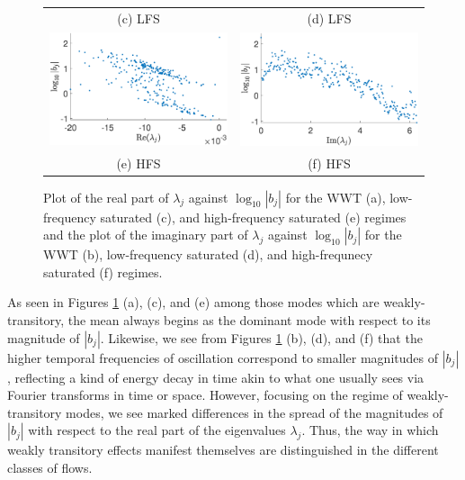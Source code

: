 \documentclass[a4paper,11pt]{article}
\begin{document}
\begin{figure}[!ht]
\begin{tabular}{cc}
(c) LFS & (d) LFS\\
\includegraphics[width=.525\textwidth]{bvals_vs_real_lam_hfforce_K_128_Lx_128_tf_1_pt5e4} &\hspace{-25pt} \includegraphics[width=.525\textwidth]{bvals_vs_imag_lam_hfforce_K_128_Lx_128_tf_1_pt5e4}\\
(e) HFS & (f) HFS
\end{tabular}
\caption{Plot of the real part of $\lambda_{j}$ against $\log_{10}|b_{j}|$ for the WWT (a), low-frequency saturated (c), and high-frequency saturated (e) regimes and the plot of the imaginary part of $\lambda_{j}$ against $\log_{10}|b_{j}|$  for the WWT (b), low-frequency saturated (d), and high-frequnecy saturated (f) regimes.}
\label{fig:wkosccomp}
\end{figure}
As seen in  Figures \ref{fig:wkosccomp} (a), (c), and (e) among those modes which are weakly-transitory, the mean always begins as the dominant mode with respect to its magnitude of $|b_{j}|$.  Likewise, we see from Figures \ref{fig:wkosccomp} (b), (d), and (f) that the higher temporal frequencies of oscillation correspond to smaller magnitudes of $|b_{j}|$, reflecting a kind of energy decay in time akin to what one usually sees via Fourier transforms in time or space.  However, focusing on the regime of weakly-transitory modes, we see marked differences in the spread of the magnitudes of $|b_{j}|$ with respect to the real part of the eigenvalues $\lambda_{j}$.  Thus, the way in which weakly transitory effects manifest themselves are distinguished in the different classes of flows.  
\end{document}
